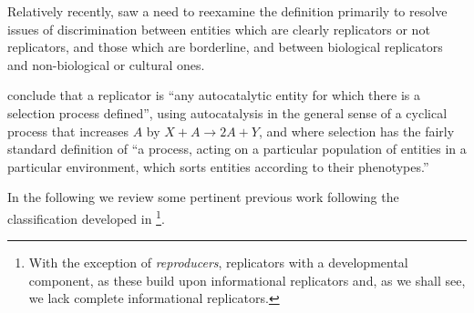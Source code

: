 Relatively recently, \textcite{Zachar2010} saw a need to reexamine the definition primarily to resolve issues of discrimination between entities which are clearly replicators or not replicators, and those which are borderline, and between biological replicators and non-biological or cultural ones. 


\Textcite{Zachar2010} conclude that a replicator is ``any autocatalytic entity for which there is a selection process defined'', using autocatalysis in the general sense of a cyclical process that increases $A$ by $X + A\rightarrow 2A + Y$, and where selection has the fairly standard definition of ``a process, acting on a particular population of entities in a particular environment, which sorts entities according to their phenotypes.'' \parencite[p.21]{Zachar2010}

In the following  we review some pertinent previous work following the classification developed in \textcite{Zachar2010}\footnote{With the exception of \emph{reproducers}, replicators with a developmental component, as these build upon informational replicators and, as we shall see, we lack complete informational replicators.}.

